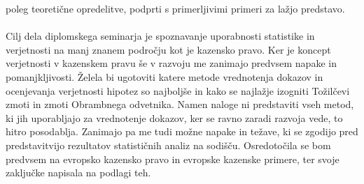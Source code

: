 \documentclass[fin1, tisk]{fmfdelo}
\theoremstyle{definition} %
\theoremstyle{trditev} %
\theoremstyle{izrek}
\begin{document}
poleg teoretične opredelitve, podprti s primerljivimi primeri za lažjo predstavo.\\\\
Cilj dela diplomskega seminarja je spoznavanje uporabnosti statistike in verjetnosti na manj znanem področju kot je kazensko pravo. Ker je koncept 
verjetnosti v kazenskem pravu še v razvoju me zanimajo predvsem napake in pomanjkljivosti. Želela bi ugotoviti katere metode vrednotenja 
dokazov in ocenjevanja verjetnosti hipotez so najboljše in kako se najlažje izogniti Tožilčevi zmoti in zmoti Obrambnega odvetnika. Namen 
naloge ni predstaviti vseh metod, ki jih uporabljajo za vrednotenje dokazov, ker se ravno zaradi razvoja vede, to hitro posodablja. Zanimajo pa 
me tudi možne napake in težave, ki se zgodijo pred predstavitvijo rezultatov statističnih analiz na sodišču. Osredotočila se bom 
predvsem na evropsko kazensko pravo in evropske kazenske primere, ter svoje zaključke napisala na podlagi teh.

\end{document}
